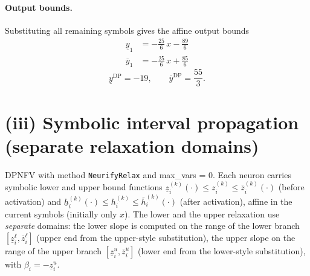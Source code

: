 \documentclass[11pt]{article}
\begin{document}
\paragraph{Output bounds.}
Substituting all remaining symbols gives the affine output bounds
\begin{align*}
\underline{y}_{1} &= -\frac{25}{6}\,x - \frac{89}{6}
\end{align*}
\begin{align*}
\overline{y}_{1} &= -\frac{25}{6}\,x + \frac{85}{6}
\end{align*}
\begin{equation*}
\underline{y}^{\text{DP}} = -19, \qquad \overline{y}^{\text{DP}} = \frac{55}{3}.
\end{equation*}

\section{(iii) Symbolic interval propagation (separate relaxation domains)}
DPNFV with method \texttt{NeurifyRelax} and max\_vars = 0. Each neuron carries symbolic lower and upper bound functions
$\underline{z}^{(k)}_i(\cdot) \le z^{(k)}_i \le \overline{z}^{(k)}_i(\cdot)$ (before activation)
and $\underline{h}^{(k)}_i(\cdot) \le h^{(k)}_i \le \overline{h}^{(k)}_i(\cdot)$ (after activation),
affine in the current symbols (initially only $x$).
The lower and the upper relaxation use \emph{separate} domains:
the lower slope is computed on the range of the lower branch
$[\underline{z}^{\ell}_i, \overline{z}^{\ell}_i]$ (upper end from the upper-style substitution),
the upper slope on the range of the upper branch
$[\underline{z}^{u}_i, \overline{z}^{u}_i]$ (lower end from the lower-style substitution),
with $\beta_i = -\underline{z}^{u}_i$.
\end{document}
